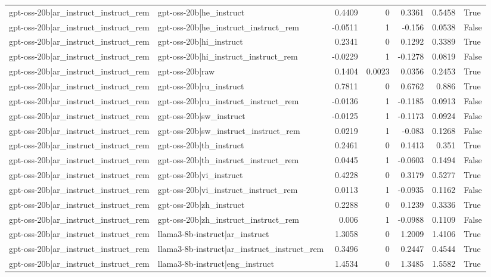 \begin{table}
\begin{tabular}{l l r r r r l}
gpt-oss-20b|ar_instruct_instruct_rem & gpt-oss-20b|he_instruct & 0.4409 & 0 & 0.3361 & 0.5458 & True \\
gpt-oss-20b|ar_instruct_instruct_rem & gpt-oss-20b|he_instruct_instruct_rem & -0.0511 & 1 & -0.156 & 0.0538 & False \\
gpt-oss-20b|ar_instruct_instruct_rem & gpt-oss-20b|hi_instruct & 0.2341 & 0 & 0.1292 & 0.3389 & True \\
gpt-oss-20b|ar_instruct_instruct_rem & gpt-oss-20b|hi_instruct_instruct_rem & -0.0229 & 1 & -0.1278 & 0.0819 & False \\
gpt-oss-20b|ar_instruct_instruct_rem & gpt-oss-20b|raw & 0.1404 & 0.0023 & 0.0356 & 0.2453 & True \\
gpt-oss-20b|ar_instruct_instruct_rem & gpt-oss-20b|ru_instruct & 0.7811 & 0 & 0.6762 & 0.886 & True \\
gpt-oss-20b|ar_instruct_instruct_rem & gpt-oss-20b|ru_instruct_instruct_rem & -0.0136 & 1 & -0.1185 & 0.0913 & False \\
gpt-oss-20b|ar_instruct_instruct_rem & gpt-oss-20b|sw_instruct & -0.0125 & 1 & -0.1173 & 0.0924 & False \\
gpt-oss-20b|ar_instruct_instruct_rem & gpt-oss-20b|sw_instruct_instruct_rem & 0.0219 & 1 & -0.083 & 0.1268 & False \\
gpt-oss-20b|ar_instruct_instruct_rem & gpt-oss-20b|th_instruct & 0.2461 & 0 & 0.1413 & 0.351 & True \\
gpt-oss-20b|ar_instruct_instruct_rem & gpt-oss-20b|th_instruct_instruct_rem & 0.0445 & 1 & -0.0603 & 0.1494 & False \\
gpt-oss-20b|ar_instruct_instruct_rem & gpt-oss-20b|vi_instruct & 0.4228 & 0 & 0.3179 & 0.5277 & True \\
gpt-oss-20b|ar_instruct_instruct_rem & gpt-oss-20b|vi_instruct_instruct_rem & 0.0113 & 1 & -0.0935 & 0.1162 & False \\
gpt-oss-20b|ar_instruct_instruct_rem & gpt-oss-20b|zh_instruct & 0.2288 & 0 & 0.1239 & 0.3336 & True \\
gpt-oss-20b|ar_instruct_instruct_rem & gpt-oss-20b|zh_instruct_instruct_rem & 0.006 & 1 & -0.0988 & 0.1109 & False \\
gpt-oss-20b|ar_instruct_instruct_rem & llama3-8b-instruct|ar_instruct & 1.3058 & 0 & 1.2009 & 1.4106 & True \\
gpt-oss-20b|ar_instruct_instruct_rem & llama3-8b-instruct|ar_instruct_instruct_rem & 0.3496 & 0 & 0.2447 & 0.4544 & True \\
gpt-oss-20b|ar_instruct_instruct_rem & llama3-8b-instruct|eng_instruct & 1.4534 & 0 & 1.3485 & 1.5582 & True \\

\end{tabular}
\end{table}
